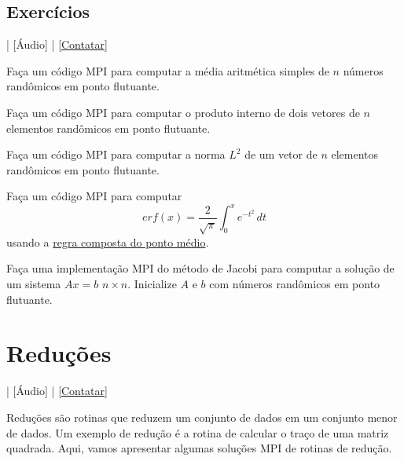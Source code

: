 \subsection* {Exercícios}

\begin{flushright}
  [Vídeo] | [Áudio] | \href{https://phkonzen.github.io/notas/contato.html}{[Contatar]}
\end{flushright}

\begin{exer}
  Faça um código MPI para computar a média aritmética simples de $n$ números randômicos em ponto flutuante.
\end{exer}

\begin{exer}
  Faça um código MPI para computar o produto interno de dois vetores de $n$ elementos randômicos em ponto flutuante.
\end{exer}

\begin{exer}
  Faça um código MPI para computar a norma $L^2$ de um vetor de $n$ elementos randômicos em ponto flutuante.
\end{exer}

\begin{exer}
  Faça um código MPI para computar
  \begin{equation}
    erf(x) = \frac{2}{\sqrt{\pi}}\int_0^x e^{-t^2}\,dt
  \end{equation}
  usando a \href{https://phkonzen.github.io/notas/MatematicaNumerica/cap_integr_sec_int_comp.html}{regra composta do ponto médio}.
\end{exer}

\begin{exer}
  Faça uma implementação MPI do método de Jacobi para computar a solução de um sistema $Ax=b$ $n\times n$. Inicialize $A$ e $b$ com números randômicos em ponto flutuante.
\end{exer}


\section {Reduções} \label {cap_mpi_sec_redu}

\begin{flushright}
  [Vídeo] | [Áudio] | \href{https://phkonzen.github.io/notas/contato.html}{[Contatar]}
\end{flushright}

Reduções são rotinas que reduzem um conjunto de dados em um conjunto menor de dados. Um exemplo de redução é a rotina de calcular o traço de uma matriz quadrada. Aqui, vamos apresentar algumas soluções MPI de rotinas de redução.

